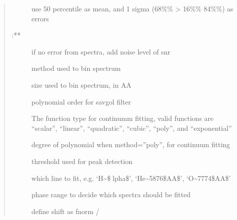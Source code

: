 \documentclass[letterpaper,10pt,english]{sphinxmanual}
\begin{document}
\begin{fulllineitems}
\begin{fulllineitems}
\begin{quote}
\begin{description}
\begin{description}
\item[{}] \leavevmode{[}\sphinxtitleref{list}{]}
use 50 percentile as mean, and 1 sigma (68\%\% \sphinxhyphen{}\textgreater{} 16\%\% \sphinxhyphen{} 84\%\%) as errors

\item[{ :**}] \leavevmode
\item[{}] \leavevmode{[}\sphinxtitleref{int}{]}
if no error from spectra, add noise level of snr

\item[{}] \leavevmode{[}\sphinxtitleref{str}{]}
method used to bin spectrum

\item[{}] \leavevmode{[}\sphinxtitleref{int}{]}
size used to bin spectrum, in AA

\item[{}] \leavevmode{[}\sphinxtitleref{int}{]}
polynomial order for savgol filter

\item[{}] \leavevmode{[}\sphinxtitleref{str}{]}
The function type for continumm fitting, valid functions are “scalar”, “linear”, “quadratic”, “cubic”, “poly”, and “exponential”

\item[{}] \leavevmode{[}\sphinxtitleref{int}{]}
degree of polynomial when method=”poly”, for continuum fitting

\item[{}] \leavevmode{[}\sphinxtitleref{int}{]}
threshold used for peak detection

\item[{}] \leavevmode{[}\sphinxtitleref{str}{]}
which line to fit, e.g. ‘H\textasciitilde{}\$lpha\$’, ‘He\textasciitilde{}5876\$AA\$’, ‘O\textasciitilde{}7774\$AA\$’

\item[{}] \leavevmode{[}\sphinxtitleref{list}{]}
phase range to decide which spectra should be fitted

\item[{}] \leavevmode{[}\sphinxtitleref{float}{]}
define shift as fnorm / 


\end{description}
\end{description}
\end{quote}
\end{fulllineitems}
\end{fulllineitems}
\end{document}
